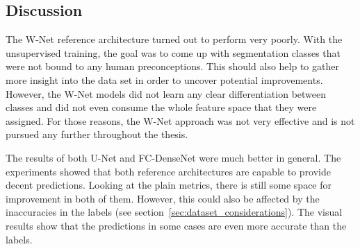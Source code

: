 \subsection{Discussion}
\label{sec:segmentation_discussion}
The W-Net reference architecture turned out to perform very poorly. With the unsupervised training, the goal was to come up with segmentation classes that were not bound to any human preconceptions. This should also help to gather more insight into the data set in order to uncover potential improvements. However, the W-Net models did not learn any clear differentiation between classes and did not even consume the whole feature space that they were assigned. For those reasons, the W-Net approach was not very effective and is not pursued any further throughout the thesis.

The results of both U-Net and FC-DenseNet were much better in general. The experiments showed that both reference architectures are capable to provide decent predictions. Looking at the plain metrics, there is still some space for improvement in both of them. However, this could also be affected by the inaccuracies in the labels (see section~\ref{sec:dataset_considerations}). The visual results show that the predictions in some cases are even more accurate than the labels.

